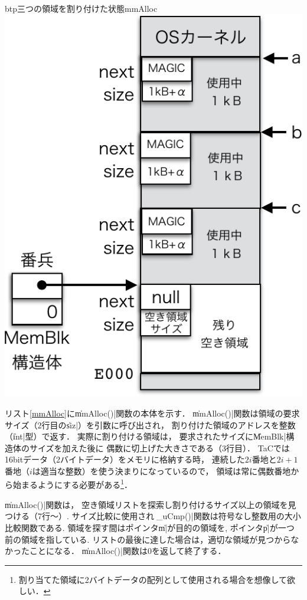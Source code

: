 \begin{myfig}{btp}{三つの領域を割り付けた状態}{mmAlloc}
  \includegraphics[scale=0.66]{Fig/mmAlloc-crop.pdf}
\end{myfig}

リスト\ref{mmAlloc}に\|mmAlloc()|関数の本体を示す．
\|mmAlloc()|関数は領域の要求サイズ（2行目の\|siz|）を引数に呼び出され，
割り付けた領域のアドレスを整数（\|int|型）で返す．
実際に割り付ける領域は，
要求されたサイズに\|MemBlk|構造体のサイズを加えた後に
偶数に切上げた大きさである（3行目）．
TaCでは16bitデータ（2バイトデータ）をメモリに格納する時，
連続した$2i$番地と$2i+1$番地（$i$は適当な整数）を使う決まりになっているので，
領域は常に偶数番地から始まるようにする必要がある\footnote{
  割り当てた領域に2バイトデータの配列として使用される場合を想像して欲しい．}．



\|mmAlloc()|関数は，
空き領域リストを探索し割り付けるサイズ以上の領域を見つける（7行〜）.
サイズ比較に使用される\|_uCmp()|関数は符号なし整数用の大小比較関数である.
領域を探す間はポインタ\|m|が目的の領域を,
ポインタ\|p|が一つ前の領域を指している.
リストの最後に達した場合は，適切な領域が見つからなかったことになる．
\|mmAlloc()|関数は0を返して終了する．

